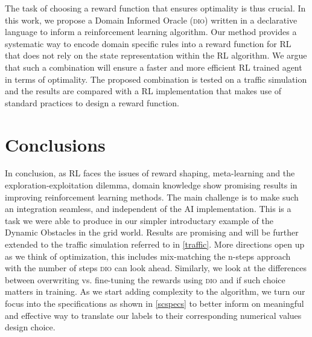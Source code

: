 \documentclass[a4paper,11pt]{article}
\theoremstyle{definition}
\newcommand{\dio}{\textsc{dio}}
\begin{document}
The task of choosing a reward function that ensures optimality is thus
crucial. 
%
In this work, we propose a Domain Informed Oracle (\dio{}) written in a
declarative language to inform a reinforcement learning algorithm. 
%
Our method provides a systematic way to encode domain specific rules
into a reward function for RL that does not rely on the state
representation within the RL algorithm.
%
We argue that such a combination will ensure a faster and more
efficient RL trained agent in terms of optimality. 
%
The proposed combination is tested on a traffic simulation and the
results are compared with a RL implementation that makes use of
standard practices to design a reward function. 
















\section{Conclusions}

In conclusion, as RL faces the issues of reward shaping, meta-learning and the exploration-exploitation dilemma, domain knowledge show promising results in 
improving reinforcement learning methods. The main challenge is to make such an integration seamless, and independent of the AI implementation. 
This is a task we were able to produce in our simpler introductary example of the Dynamic Obstacles in the grid world. Results are promising and will be further 
extended to the traffic simulation referred to in \ref{traffic}. More directions open up as we think of optimization, this includes mix-matching the n-steps approach with the 
number of steps \dio{} can look ahead. Similarly, we look at the differences between overwriting vs. fine-tuning the rewards using \dio{} and if such choice matters in training. 
As we start adding complexity to the algorithm, we turn our focus into the specifications as shown in \ref{scspecs} to better inform 
on meaningful and effective way to translate our labels to their corresponding numerical values design choice. 

\newpage




\newpage

\appendix

\newpage

\glsaddall
\printglossary[style=mcolindex, title=Terminology, toctitle=List of Terms]
\end{document}
